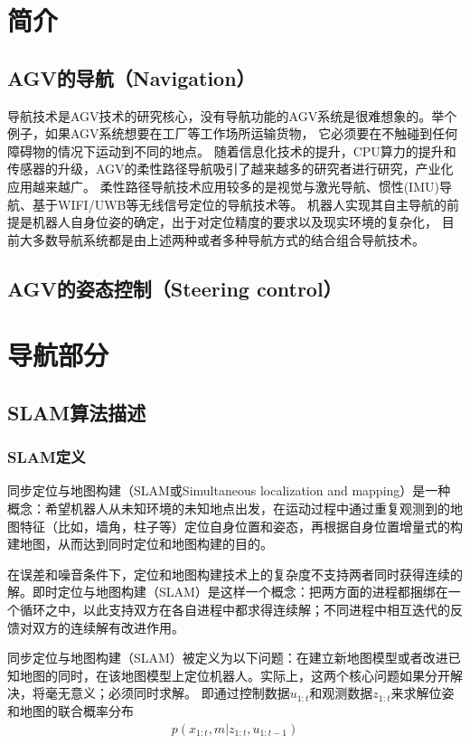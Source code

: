 \documentclass[cs4size,a4paper]{ctexart}
\numberwithin{equation}{section}
\numberwithin{table}{section}
\numberwithin{figure}{section}
\begin{document}
\section{简介}
\subsection{AGV的导航（Navigation）}
导航技术是AGV技术的研究核心，没有导航功能的AGV系统是很难想象的。举个例子，如果AGV系统想要在工厂等工作场所运输货物，
它必须要在不触碰到任何障碍物的情况下运动到不同的地点。
随着信息化技术的提升，CPU算力的提升和传感器的升级，AGV的柔性路径导航吸引了越来越多的研究者进行研究，产业化应用越来越广。
柔性路径导航技术应用较多的是视觉与激光导航、惯性(IMU)导航\cite{5670227}、基于WIFI/UWB等无线信号定位\cite{4380919}的导航技术等。
机器人实现其自主导航的前提是机器人自身位姿的确定，出于对定位精度的要求以及现实环境的复杂化，
目前大多数导航系统都是由上述两种或者多种导航方式的结合组合导航技术\cite{7916260,}。


\subsection{AGV的姿态控制（Steering control）}

\section{导航部分}
\subsection{SLAM算法描述}
\subsubsection{SLAM定义}
同步定位与地图构建（SLAM或Simultaneous localization and mapping）是一种概念：希望机器人从未知环境的未知地点出发，在运动过程中通过重复观测到的地图特征（比如，墙角，柱子等）定位自身位置和姿态，再根据自身位置增量式的构建地图，从而达到同时定位和地图构建的目的。

在误差和噪音条件下，定位和地图构建技术上的复杂度不支持两者同时获得连续的解。即时定位与地图构建（SLAM）是这样一个概念：把两方面的进程都捆绑在一个循环之中，以此支持双方在各自进程中都求得连续解；不同进程中相互迭代的反馈对双方的连续解有改进作用。

同步定位与地图构建（SLAM）被定义为以下问题：在建立新地图模型或者改进已知地图的同时，在该地图模型上定位机器人。实际上，这两个核心问题如果分开解决，将毫无意义；必须同时求解。
即通过控制数据$u_{1:t}$和观测数据$z_{1:t}$来求解位姿和地图的联合概率分布
\begin{align}
    p\left(x_{1: t}, m | z_{1: t}, u_{1: t-1}\right)
\end{align}
\end{document}
